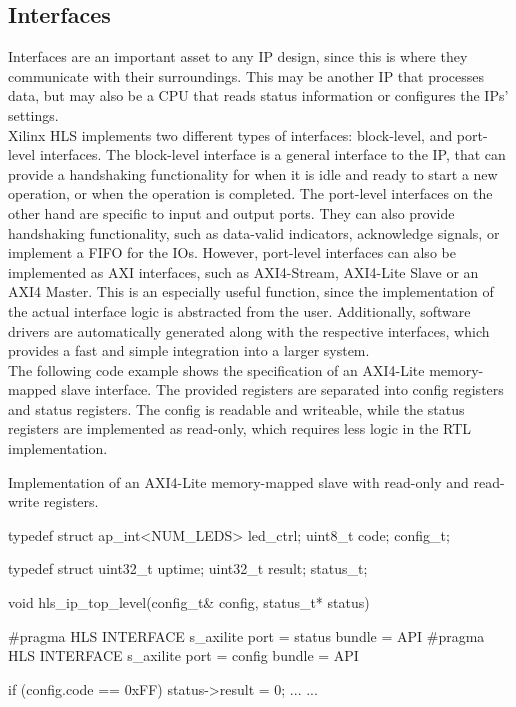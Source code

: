 \subsection{Interfaces}

Interfaces are an important asset to any IP design, since this is where they communicate with their surroundings.
This may be another IP that processes data, but may also be a CPU that reads status information or configures the IPs' settings.\\

Xilinx HLS implements two different types of interfaces: block-level, and port-level interfaces.
The block-level interface is a general interface to the IP, that can provide a handshaking functionality for when it is idle and ready to start a new operation, or when the operation is completed.
The port-level interfaces on the other hand are specific to input and output ports.
They can also provide handshaking functionality, such as data-valid indicators, acknowledge signals, or implement a FIFO for the IOs.
However, port-level interfaces can also be implemented as AXI interfaces, such as AXI4-Stream, AXI4-Lite Slave or an AXI4 Master.
This is an especially useful function, since the implementation of the actual interface logic is abstracted from the user.
Additionally, software drivers are automatically generated along with the respective interfaces, which provides a fast and simple integration into a larger system.\\

The following code example shows the specification of an AXI4-Lite memory-mapped slave interface.
The provided registers are separated into config registers and status registers.
The config is readable and writeable, while the status registers are implemented as read-only, which requires less logic in the RTL implementation.\\

\begin{program}
  \caption{Implementation of an AXI4-Lite memory-mapped slave with read-only and read-write registers.}
  \label{prog:axi4_lite}
  \begin{CppCode}
    typedef struct {
      ap_int<NUM_LEDS> led_ctrl;
      uint8_t code;
    } config_t;

    typedef struct {
      uint32_t uptime;
      uint32_t result;
    } status_t;

    void hls_ip_top_level(config_t& config,
                          status_t* status) {
        #pragma HLS INTERFACE s_axilite port = status bundle = API
        #pragma HLS INTERFACE s_axilite port = config bundle = API

        if (config.code == 0xFF) {
          status->result = 0;
          ...
        }
        ...
    }
  \end{CppCode}
\end{program}

